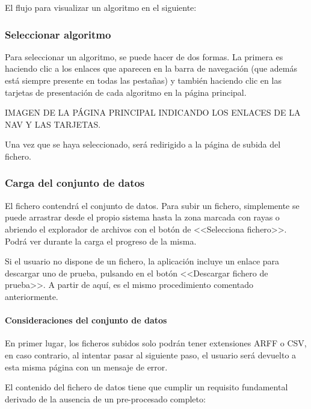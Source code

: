 El flujo para visualizar un algoritmo en el siguiente:


\subsubsection{Seleccionar algoritmo}
Para seleccionar un algoritmo, se puede hacer de dos formas. La primera es
haciendo clic a los enlaces que aparecen en la barra de navegación (que además
está siempre presente en todas las pestañas) y también haciendo clic en las
tarjetas de presentación de cada algoritmo en la página principal.

IMAGEN DE LA PÁGINA PRINCIPAL INDICANDO LOS ENLACES DE LA NAV Y LAS TARJETAS.

Una vez que se haya seleccionado, será redirigido a la página de subida del
fichero. 

\subsubsection{Carga del conjunto de datos}

El fichero contendrá el conjunto de datos. Para subir un fichero, simplemente se
puede arrastrar desde el propio sistema hasta la zona marcada con rayas o
abriendo el explorador de archivos con el botón de <<Selecciona fichero>>. Podrá
ver durante la carga el progreso de la misma.

Si el usuario no dispone de un fichero, la aplicación incluye un enlace para
descargar uno de prueba, pulsando en el botón <<Descargar fichero de prueba>>. A
partir de aquí, es el mismo procedimiento comentado anteriormente.


\paragraph{Consideraciones del conjunto de datos} En primer lugar, los ficheros
subidos solo podrán tener extensiones ARFF o CSV, en caso contrario, al intentar
pasar al siguiente paso, el usuario será devuelto a esta misma página con un
mensaje de error.

El contenido del fichero de datos tiene que cumplir un requisito fundamental
derivado de la ausencia de un pre-procesado completo: 

